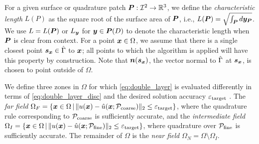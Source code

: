 For a given surface or quadrature patch ${\bm{P}}: {\mathcal{I}}^2 \rightarrow \mathbb{R}^3$,  we define the \textit{characteristic length} $L(P)$ as the square root of the surface area of ${\bm{P}}$, i.e., $L({\bm{P}}) = \sqrt{\int_{{\bm{P}}}d{\bm{y}}_{{\bm{P}}}}$.
We use  $L = L({\bm{P}})$ or $L_{\bm{y}}$ for ${\bm{y}} \in {\bm{P}}(D)$ to denote the characteristic length when ${\bm{P}}$ is clear from context.
For a point ${\bm{x}} \in \Omega$, we assume that there is a single closest point ${\bm{s}_{\bm{x}}} \in \hat{\Gamma}$ to ${\bm{x}}$; all points to which the algorithm is applied will have this property by construction.  
Note that ${\bm{n}}({\bm{s}_{\bm{x}}})$, the vector normal to $\hat{\Gamma}$ at ${\bm{s}_{\bm{x}}}$, is chosen to point outside of $\Omega$.


We define three zones in $\Omega$ for which \cref{eq:double_layer} is evaluated differently in terms of \cref{eq:double_layer_disc} and the desired solution accuracy ${\varepsilon_{\mathrm{target}}}$ .
The \emph{far field}  $\Omega_F = \{{\bm{x}} \in \Omega \,|\, \|u({\bm{x}}) - \hat{u}({\bm{x}};{\mathcal{P}_{\mathrm{coarse}}})\|_2 \leq {\varepsilon_{\ensuremath{\mathrm{target}}}}\}$, where the quadrature rule corresponding to ${\mathcal{P}_{\mathrm{coarse}}}$ is sufficiently accurate, and the \emph{intermediate field}  $\Omega_I= \{{\bm{x}} \in \Omega \,|\, \|u({\bm{x}}) - \hat{u}({\bm{x}};{\mathcal{P}_{\mathrm{fine}}})\|_2 \leq {\varepsilon_{\ensuremath{\mathrm{target}}}}\}$, where quadrature over ${\mathcal{P}_{\mathrm{fine}}}$ is sufficiently accurate.
The remainder of $\Omega$ is the \emph{near field} $\Omega_N = \Omega \setminus \Omega_I$.


